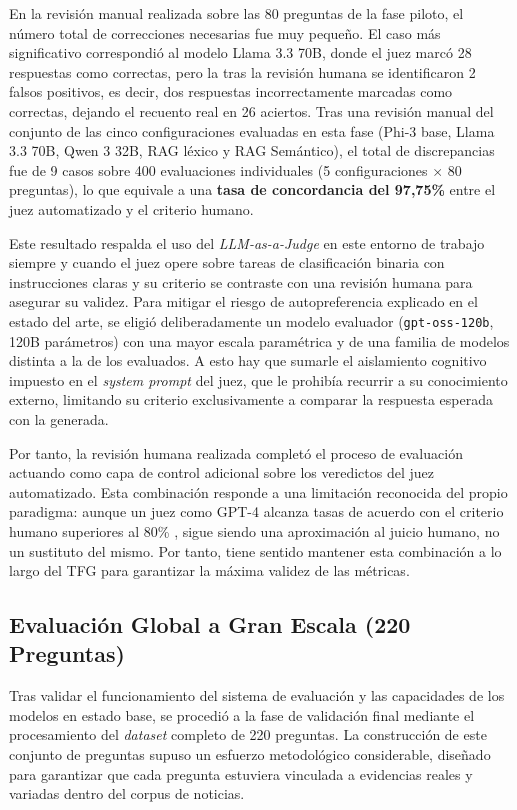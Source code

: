 En la revisión manual realizada sobre las 80 preguntas de la fase piloto, el número total de correcciones necesarias fue muy pequeño. El caso más significativo correspondió al modelo Llama 3.3 70B, donde el juez marcó 28 respuestas como correctas, pero la tras la revisión humana se identificaron 2 falsos positivos, es decir, dos respuestas incorrectamente marcadas como correctas, dejando el recuento real en 26 aciertos. Tras una revisión manual del conjunto de las cinco configuraciones evaluadas en esta fase (Phi-3 base, Llama 3.3 70B, Qwen 3 32B, RAG léxico y RAG Semántico), el total de discrepancias fue de 9 casos sobre 400 evaluaciones individuales (5 configuraciones $\times$ 80 preguntas), lo que equivale a una \textbf{tasa de concordancia del 97,75\%} entre el juez automatizado y el criterio humano.

Este resultado respalda el uso del \textit{LLM-as-a-Judge} en este entorno de trabajo siempre y cuando el juez opere sobre tareas de clasificación binaria con instrucciones claras y su criterio se contraste con una revisión humana para asegurar su validez. Para mitigar el riesgo de autopreferencia \cite{wataoka2024selfpref} explicado en el estado del arte, se eligió deliberadamente un modelo evaluador (\texttt{gpt-oss-120b}, 120B parámetros) con una mayor escala paramétrica y de una familia de modelos distinta a la de los evaluados. A esto hay que sumarle el aislamiento cognitivo impuesto en el \textit{system prompt} del juez, que le prohibía recurrir a su conocimiento externo, limitando su criterio exclusivamente a comparar la respuesta esperada con la generada.

Por tanto, la revisión humana realizada completó el proceso de evaluación actuando como capa de control adicional sobre los veredictos del juez automatizado. Esta combinación responde a una limitación reconocida del propio paradigma: aunque un juez como GPT-4 alcanza tasas de acuerdo con el criterio humano superiores al 80\% \cite{zheng2023judging}, sigue siendo una aproximación al juicio humano, no un sustituto del mismo. Por tanto, tiene sentido mantener esta combinación a lo largo del TFG para garantizar la máxima validez de las métricas.
\newpage
\subsection{Evaluación Global a Gran Escala (220 Preguntas)}

Tras validar el funcionamiento del sistema de evaluación y las capacidades de los modelos en estado base, se procedió a la fase de validación final mediante el procesamiento del \textit{dataset} completo de 220 preguntas. La construcción de este conjunto de preguntas supuso un esfuerzo metodológico considerable, diseñado para garantizar que cada pregunta estuviera vinculada a evidencias reales y variadas dentro del corpus de noticias.

